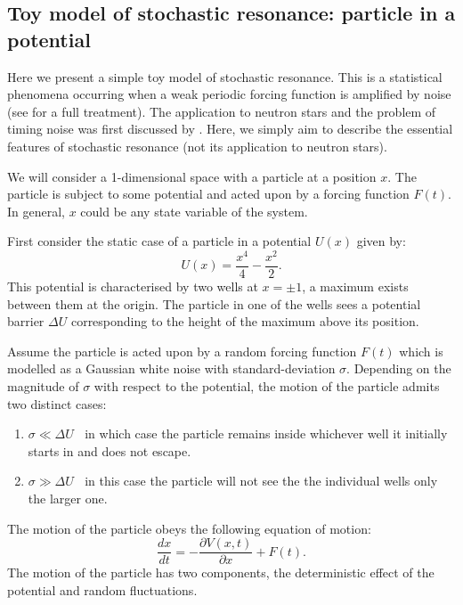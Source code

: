 \documentclass[../full_thesis/full_thesis.tex]{subfiles}
\begin{document}
\begin{subappendices}
\section{Toy model of stochastic resonance: particle in a potential}
\label{app: stochastic}

Here we present a simple toy model of stochastic resonance. This is a
statistical phenomena occurring when a weak periodic forcing function is
amplified by noise (see \citet{Jung1991} for a full treatment). The application
to neutron stars and the problem of timing noise was first discussed by
\citet{Cordes2013}. Here, we simply aim to describe the essential features of
stochastic resonance (not its application to neutron stars).

We will consider a 1-dimensional space with a particle at a position $x$. The
particle is subject to some potential and acted upon by a forcing function
$F(t)$. In general, $x$ could be any state variable of the system.
 
First consider the static case of a particle in a potential $U(x)$  given by:
\begin{equation}
    U(x) = \frac{x^{4}}{4}-\frac{x^{2}}{2}.
\end{equation}
This potential is characterised by two wells at $x=\pm1$, a maximum exists
between them at the origin. The particle in one of the wells sees a potential
barrier $\Delta U$ corresponding to the height of the maximum above its
position.

Assume the particle is acted upon by a random forcing function $F(t)$ which is
modelled as a Gaussian white noise with standard-deviation $\sigma$. Depending on the
magnitude of $\sigma$ with respect to the potential, the motion of the particle
admits two distinct cases:
\begin{enumerate}
\item $\sigma \ll \Delta U \;\;$ in which case the particle remains inside whichever
    well it initially starts in and does not escape.
\item $\sigma \gg \Delta U \;\;$ in this case the particle will not see the the
    individual wells only the larger one.
\end{enumerate}

The motion of the particle obeys the following equation of motion:
\begin{equation}
    \frac{dx}{dt} = -\frac{\partial V(x,t)}{\partial x} + F(t).
\end{equation}
The motion of the particle has two components, the deterministic effect of the
potential and random fluctuations.


\end{subappendices}
\end{document}
